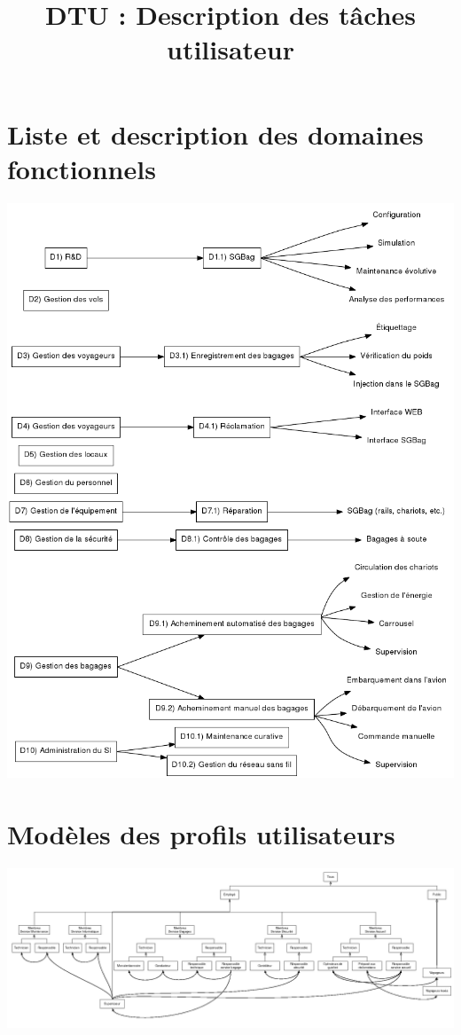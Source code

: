 

\title{DTU : Description des tâches utilisateur}


\maketitle
\tableofcontents
\newpage

\part{Liste et description des domaines fonctionnels}
\includegraphics[width=\linewidth]{../../DDF/src/img/DDF.png}
\newpage

\part{Modèles des profils utilisateurs}
\begin{center}
    \includegraphics[angle=90, height=\textheight]{../../MU/src/img/MU.png}
\end{center}
\newpage
